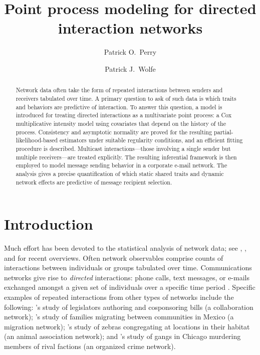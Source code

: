 \documentclass[final]{statsoc}
\title[Point Process Modeling for Directed Interaction Networks]{%
    Point process modeling for directed interaction networks
}
\author[P.\ O.\ Perry]{%
    Patrick O.\ Perry
}
\author[P.\ J.\ Wolfe]{%
    Patrick J.\ Wolfe
}
\begin{document}

\begin{abstract}

Network data often take the form of repeated interactions between senders and
receivers tabulated over time.  A primary question to ask of such data is which traits and
behaviors are predictive of interaction.  To answer this question, a model is
introduced for treating directed interactions as a multivariate point process:
a Cox multiplicative intensity model using covariates that depend on the
history of the process.  Consistency and asymptotic normality are proved for
the resulting partial-likelihood-based estimators under suitable regularity
conditions, and an efficient fitting procedure is described.  Multicast
interactions---those involving a single sender but multiple receivers---are
treated explicitly.  The resulting inferential framework is then employed to
model message sending behavior in a corporate e-mail network.  The analysis
gives a precise quantification of which static shared traits and dynamic
network effects are predictive of message recipient selection.


\end{abstract}


\section{Introduction}
\label{S:introduction}

Much effort has been devoted to the statistical analysis of network data;
see \citet{jackson2008social}, \citet{goldenberg2009survey}, and \citet{kolaczyk2009statistical}
for recent overviews.  Often network observables comprise counts of interactions
between individuals or groups tabulated over time.  Communications networks
give rise to \emph{directed} interactions: phone calls, text messages, or
e-mails exchanged amongst a given set of individuals over a specific time
period \citep{tyler2005email,eagle2006reality}.  Specific examples of repeated
interactions from other types of networks include the following:
's \citeyearpar{fowler2006connecting}
study of legislators authoring and cosponsoring bills (a collaboration
network);
's \citeyearpar{mckenzie2007network} study
of families migrating between communities in Mexico (a migration network);
's \citeyearpar{sundaresan2007network}
study of zebras congregating at locations in
their habitat (an animal association network);
and 's \citeyearpar{papachristos2009murder}
study of gangs in Chicago murdering members of rival factions (an organized
crime network).
\end{document}
